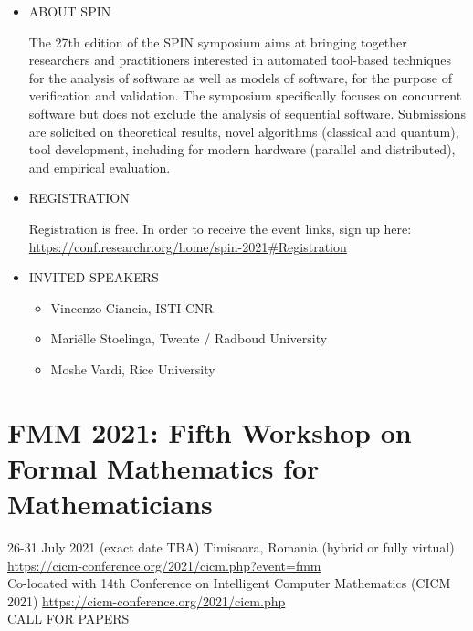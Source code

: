\documentclass[prodmode,acmtecs]{acmsmall} %
\begin{document}
\begin{itemize}\item  ABOUT SPIN 
 
  The 27th edition of the SPIN symposium aims at bringing together researchers and practitioners interested in automated tool-based techniques for the analysis of software as well as models of software, for the purpose of verification and validation. The symposium specifically focuses on concurrent software but does not exclude the analysis of sequential software. Submissions are solicited on theoretical results, novel algorithms (classical and quantum), tool development, including for modern hardware (parallel and distributed), and empirical evaluation. 
 
\item  REGISTRATION 
 
  Registration is free. In order to receive the event links, sign up here: \href{https://conf.researchr.org/home/spin-2021#Registration}{https://conf.researchr.org/home/spin-2021\#Registration} 
 
\item  INVITED SPEAKERS  
 
\begin{itemize}\item  Vincenzo Ciancia, ISTI-CNR 
\item  Mariëlle Stoelinga, Twente / Radboud University 
\item  Moshe Vardi, Rice University
\end{itemize} 
\end{itemize}\section{FMM 2021: Fifth Workshop on Formal Mathematics for Mathematicians}\label{FMM2021}  26-31 July 2021 (exact date TBA) Timisoara, Romania (hybrid or fully virtual) \href{https://cicm-conference.org/2021/cicm.php?event=fmm}{https://cicm-conference.org/2021/cicm.php?event=fmm}  \\ 
  Co-located with 14th Conference on Intelligent Computer Mathematics (CICM 2021) \href{https://cicm-conference.org/2021/cicm.php}{https://cicm-conference.org/2021/cicm.php}\\ 
CALL FOR PAPERS 
\end{document}
